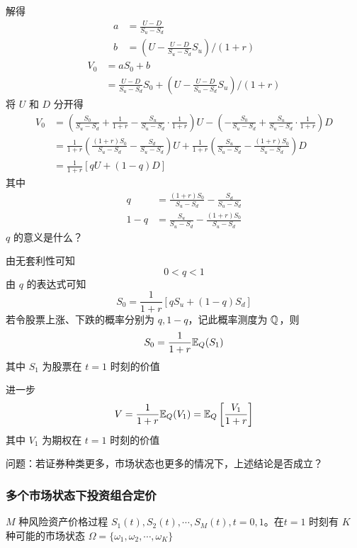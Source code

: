 解得
\[
\begin{aligned}
    a&=\frac{U-D}{S_u-S_d}\\
    b&=(U-\frac{U-D}{S_u-S_d}S_u)/(1+r)
\end{aligned}
\]
\[
\begin{aligned}
    V_0&=aS_0+b\\
    &=\frac{U-D}{S_u-S_d}S_0+(U-\frac{U-D}{S_u-S_d}S_u)/(1+r)
\end{aligned}
\]
将 $U$ 和 $D$ 分开得
\[
\begin{aligned}
    V_0&=\left(\frac{S_0}{S_u-S_d}+\frac{1}{1+r}-\frac{S_u}{S_u-S_d}\cdot \frac{1}{1+r}\right)U-\left(-\frac{S_0}{S_u-S_d}+\frac{S_u}{S_u-S_d}\cdot \frac{1}{1+r}\right)D\\
    &=\frac{1}{1+r}\left(\frac{(1+r)S_0}{S_u-S_d}-\frac{S_d}{S_u-S_d}\right)U+\frac{1}{1+r}\left(\frac{S_u}{S_u-S_d}-\frac{(1+r)S_0}{S_u-S_d}\right)D\\
    &=\frac{1}{1+r}[qU+(1-q)D]
\end{aligned}
\]
其中
\[
\begin{aligned}
    q&=\frac{(1+r)S_0}{S_u-S_d}-\frac{S_d}{S_u-S_d}\\
    1-q&=\frac{S_u}{S_u-S_d}-\frac{(1+r)S_0}{S_u-S_d}
\end{aligned}
\]
$q$ 的意义是什么？

由无套利性可知
\[
0<q<1
\]
由 $q$ 的表达式可知
\[
S_0=\frac{1}{1+r}[qS_u+(1-q)S_d]
\]
若令股票上涨、下跌的概率分别为 $q,1-q$，记此概率测度为 $\mathbb{Q}$，则
\[
S_0=\frac{1}{1+r}\mathbb E_Q(S_1)
\]
其中 $S_1$ 为股票在 $t=1$ 时刻的价值

进一步
\[
    V=\frac{1}{1+r}\mathbb E_Q(V_1)=\mathbb E_Q\left[\frac{V_1}{1+r} \right]
\]
其中 $V_1$ 为期权在 $t=1$ 时刻的价值

问题：若证券种类更多，市场状态也更多的情况下，上述结论是否成立？

\subsubsection{多个市场状态下投资组合定价}

$M$ 种风险资产价格过程 $S_1(t),S_2(t),\cdots,S_M(t), t=0,1$。在$t=1$ 时刻有 $K$ 种可能的市场状态 $\Omega=\{\omega_1,\omega_2,\cdots,\omega_K\}$

